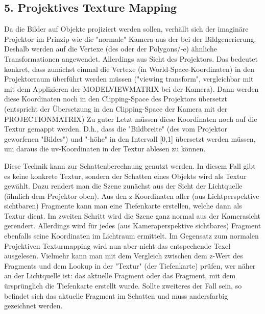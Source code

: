 \documentclass[a4paper,headings=small]{scrartcl}
\numberwithin{equation}{section} %
\numberwithin{figure}{section}   %
\begin{document}
\subsection*{5. Projektives Texture Mapping}
Da die Bilder auf Objekte projiziert werden sollen, verhällt sich der imaginäre Projektor im Prinzip wie die "normale" Kamera aus der bei der Bildgenerierung.
Deshalb werden auf die Vertexe (des oder der Polygons/-e) ähnliche Transformationen angewendet.
Allerdings aus Sicht des Projektors.
Das bedeutet konkret, dass zunächst einmal die Vertexe (in World-Space-Koordinaten) in den Projektorraum überführt werden müssen ("viewing transform", vergleichbar mit mit dem Applizieren der MODELVIEWMATRIX bei der Kamera).
Dann werden diese Koordinaten noch in den Clipping-Space des Projektors übersetzt (entspricht der Übersetzung in den Clipping-Space der Kamera mit der PROJECTIONMATRIX)
Zu guter Letzt müssen diese Koordinaten noch auf die Textur gemappt werden.
D.h., dass die "Bildbreite" (des vom Projektor geworfenen "Bildes") und "-höhe" in den Intervall [0,1] übersetzt werden müssen, um daraus die uv-Koordinaten in der Textur ablesen zu können.

Diese Technik kann zur Schattenberechnung genutzt werden. In diesem Fall gibt es keine konkrete Textur, sondern der Schatten eines Objekts wird als Textur gewählt.
Dazu rendert man die Szene zunächst aus der Sicht der Lichtquelle (ähnlich dem Projektor oben).
Aus den z-Koordinaten aller (aus Lichtperspektive sichtbaren) Fragmente kann man eine Tiefenkarte erstellen, welche dann als Textur dient.
Im zweiten Schritt wird die Szene ganz normal aus der Kamerasicht gerendert.
Allerdings wird für jedes (aus Kameraperspektive sichtbares) Fragment ebenfalls seine Koordinaten im Lichtraum ermittelt.
Im Gegensatz zum normalen Projektiven Texturmapping wird nun aber nicht das entspechende Texel ausgelesen.
Vielmehr kann man mit dem Vergleich zwischen dem z-Wert des Fragments und dem Lookup in der "Textur" (der Tiefenkarte) prüfen, wer näher an der Lichtquelle ist: das aktuelle Fragment oder das Fragment, mit dem ürsprünglich die Tiefenkarte erstellt wurde. Sollte zweiteres der Fall sein, so befindet sich das aktuelle Fragment im Schatten und muss andersfarbig gezeichnet werden.
\end{document}
